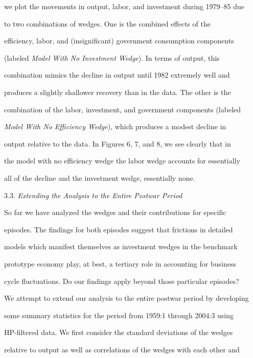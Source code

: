 \documentclass[fleqn,leqno,11pt]{article}
\begin{document}
we plot the movements in output, labor, and investment during 1979--85 due

to two combinations of wedges. One is the combined effects of the

efficiency, labor, and (insignificant) government consumption components

(labeled \emph{Model With No Investment Wedge}). In terms of output, this

combination mimics the decline in output until 1982 extremely well and

produces a slightly shallower recovery than in the data. The other is the

combination of the labor, investment, and government components (labeled 

\emph{Model With No Efficiency Wedge}), which produces a modest decline in

output relative to the data. In Figures 6, 7, and 8, we see clearly that in

the model with no efficiency wedge the labor wedge accounts for essentially

all of the decline and the investment wedge, essentially none. \bigskip



\begin{center}

3.3. \emph{Extending the Analysis to the Entire Postwar Period}

\end{center}



So far we have analyzed the wedges and their contributions for specific

episodes. The findings for both episodes suggest that frictions in detailed

models which manifest themselves as investment wedges in the benchmark

prototype economy play, at best, a tertiary role in accounting for business

cycle fluctuations. Do our findings apply beyond those particular episodes?

We attempt to extend our analysis to the entire postwar period by developing

some summary statistics for the period from 1959:1 through 2004:3 using

HP-filtered data. We first consider the standard deviations of the wedges

relative to output as well as correlations of the wedges with each other and
\end{document}
